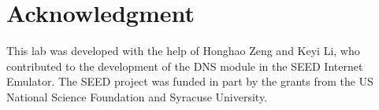 



\section*{Acknowledgment} 

This lab was developed with the help of Honghao Zeng and Keyi Li, who
contributed to the development of the DNS module in the SEED 
Internet Emulator. The SEED project was funded in part 
by the grants from the US National Science Foundation
and Syracuse University.





